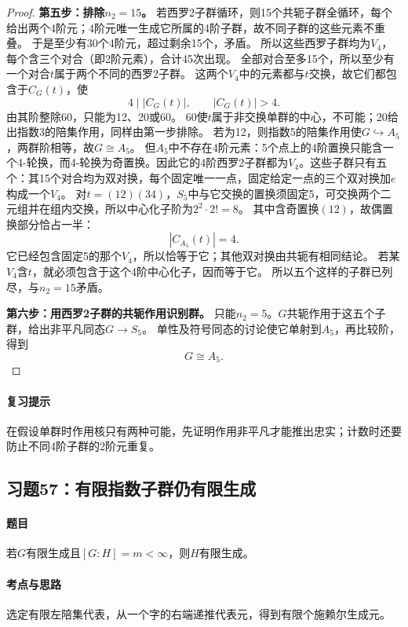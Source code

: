 \documentclass[UTF8,a4paper,11pt,fontset=windows]{ctexart}
\begin{document}
\begin{proof}
\textbf{第五步：排除$n_2=15$。}
若西罗2子群循环，则15个共轭子群全循环，每个给出两个4阶元；4阶元唯一生成它所属的4阶子群，故不同子群的这些元素不重叠。
于是至少有30个4阶元，超过剩余15个，矛盾。
所以这些西罗子群均为$V_4$，每个含三个对合（即2阶元素），合计45次出现。
全部对合至多15个，所以至少有一个对合$t$属于两个不同的西罗2子群。
这两个$V_4$中的元素都与$t$交换，故它们都包含于$C_G(t)$，使
\[
4\mid|C_G(t)|,\qquad|C_G(t)|>4.
\]
由其阶整除60，只能为12、20或60。
60使$t$属于非交换单群的中心，不可能；20给出指数3的陪集作用，同样由第一步排除。
若为12，则指数5的陪集作用使$G\hookrightarrow A_5$，两群阶相等，故$G\cong A_5$。
但$A_5$中不存在4阶元素：5个点上的4阶置换只能含一个4-轮换，而4-轮换为奇置换。因此它的4阶西罗2子群都为$V_4$。这些子群只有五个：其15个对合均为双对换，每个固定唯一一点，固定给定一点的三个双对换加$e$构成一个$V_4$。
对$t=(12)(34)$，$S_5$中与它交换的置换须固定5，可交换两个二元组并在组内交换，所以中心化子阶为$2^2\cdot2!=8$。
其中含奇置换$(12)$，故偶置换部分恰占一半：
\[
|C_{A_5}(t)|=4.
\]
它已经包含固定5的那个$V_4$，所以恰等于它；其他双对换由共轭有相同结论。
若某$V_4$含$t$，就必须包含于这个4阶中心化子，因而等于它。
所以五个这样的子群已列尽，与$n_2=15$矛盾。

\textbf{第六步：用西罗2子群的共轭作用识别群。}
只能$n_2=5$。$G$共轭作用于这五个子群，给出非平凡同态$G\to S_5$。
单性及符号同态的讨论使它单射到$A_5$，再比较阶，得到
\[
G\cong A_5.
\]
\end{proof}

\paragraph{复习提示}
在假设单群时作用核只有两种可能，先证明作用非平凡才能推出忠实；计数时还要防止不同4阶子群的2阶元重复。


\subsection{习题57：\texorpdfstring{有限指数子群仍有限生成}{有限指数子群仍有限生成}}
\label{ex:2:57}

\paragraph{题目}
若$G$有限生成且$[G:H]=m<\infty$，则$H$有限生成。

\paragraph{考点与思路}
选定有限左陪集代表，从一个字的右端递推代表元，得到有限个施赖尔生成元。
\end{document}
